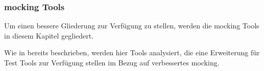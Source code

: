\subsubsection{\Gls{mock}ing Tools}\label{python-tools:extlib:mock}

Um einen bessere Gliederung zur Verfügung zu stellen, werden die \Gls{mock}ing
Tools in diesem Kapitel gegliedert.

Wie in  bereits beschrieben, werden hier Tools analysiert,
die eine Erweiterung für Test Tools zur Verfügung stellen im Bezug auf verbessertes
\gls{mock}ing.




